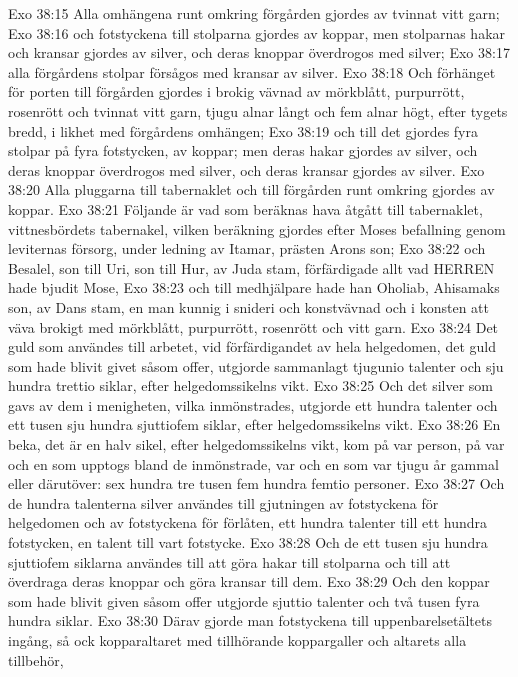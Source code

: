 Exo 38:15  Alla omhängena runt omkring förgården gjordes av tvinnat vitt garn;
Exo 38:16  och fotstyckena till stolparna gjordes av koppar, men stolparnas hakar och kransar gjordes av silver, och deras knoppar överdrogos med silver;
Exo 38:17  alla förgårdens stolpar försågos med kransar av silver.
Exo 38:18  Och förhänget för porten till förgården gjordes i brokig vävnad av mörkblått, purpurrött, rosenrött och tvinnat vitt garn, tjugu alnar långt och fem alnar högt, efter tygets bredd, i likhet med förgårdens omhängen;
Exo 38:19  och till det gjordes fyra stolpar på fyra fotstycken, av koppar; men deras hakar gjordes av silver, och deras knoppar överdrogos med silver, och deras kransar gjordes av silver.
Exo 38:20  Alla pluggarna till tabernaklet och till förgården runt omkring gjordes av koppar.
Exo 38:21  Följande är vad som beräknas hava åtgått till tabernaklet, vittnesbördets tabernakel, vilken beräkning gjordes efter Moses befallning genom leviternas försorg, under ledning av Itamar, prästen Arons son;
Exo 38:22  och Besalel, son till Uri, son till Hur, av Juda stam, förfärdigade allt vad HERREN hade bjudit Mose,
Exo 38:23  och till medhjälpare hade han Oholiab, Ahisamaks son, av Dans stam, en man kunnig i snideri och konstvävnad och i konsten att väva brokigt med mörkblått, purpurrött, rosenrött och vitt garn.
Exo 38:24  Det guld som användes till arbetet, vid förfärdigandet av hela helgedomen, det guld som hade blivit givet såsom offer, utgjorde sammanlagt tjugunio talenter och sju hundra trettio siklar, efter helgedomssikelns vikt.
Exo 38:25  Och det silver som gavs av dem i menigheten, vilka inmönstrades, utgjorde ett hundra talenter och ett tusen sju hundra sjuttiofem siklar, efter helgedomssikelns vikt.
Exo 38:26  En beka, det är en halv sikel, efter helgedomssikelns vikt, kom på var person, på var och en som upptogs bland de inmönstrade, var och en som var tjugu år gammal eller därutöver: sex hundra tre tusen fem hundra femtio personer.
Exo 38:27  Och de hundra talenterna silver användes till gjutningen av fotstyckena för helgedomen och av fotstyckena för förlåten, ett hundra talenter till ett hundra fotstycken, en talent till vart fotstycke.
Exo 38:28  Och de ett tusen sju hundra sjuttiofem siklarna användes till att göra hakar till stolparna och till att överdraga deras knoppar och göra kransar till dem.
Exo 38:29  Och den koppar som hade blivit given såsom offer utgjorde sjuttio talenter och två tusen fyra hundra siklar.
Exo 38:30  Därav gjorde man fotstyckena till uppenbarelsetältets ingång, så ock kopparaltaret med tillhörande koppargaller och altarets alla tillbehör,
